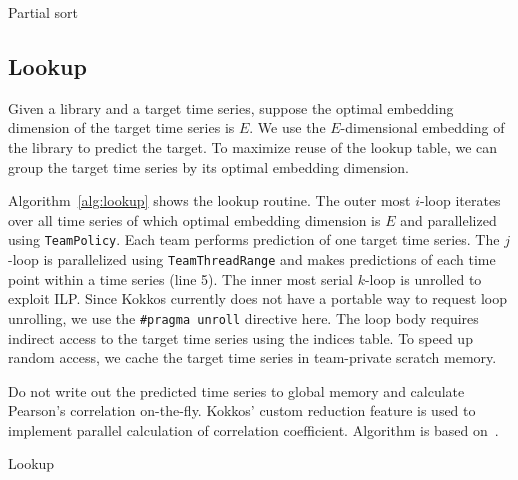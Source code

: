 \documentclass[conference]{IEEEtran}
\begin{document}
\begin{algorithm}
    \SetAlgoLined
    \DontPrintSemicolon
    \caption{Partial sort}%
    \label{alg:sort}
\end{algorithm}

\subsection{Lookup}

Given a library and a target time series, suppose the optimal embedding
dimension of the target time series is $E$. We use the $E$-dimensional embedding
of the library to predict the target. To maximize reuse of the lookup table, we
can group the target time series by its optimal embedding dimension.

Algorithm~\ref{alg:lookup} shows the lookup routine. The outer most $i$-loop
iterates over all time series of which optimal embedding dimension is $E$ and
parallelized using \texttt{TeamPolicy}. Each team performs prediction of one
target time series. The $j$-loop is parallelized using \texttt{TeamThreadRange}
and makes predictions of each time point within a time series (line 5). The
inner most serial $k$-loop is unrolled to exploit ILP\@. Since Kokkos currently
does not have a portable way to request loop unrolling, we use the
\texttt{\#pragma unroll} directive here. The loop body requires indirect access
to the target time series using the indices table. To speed up random access, we
cache the target time series in team-private scratch memory.

Do not write out the predicted time series to global memory and calculate
Pearson’s correlation on-the-fly. Kokkos’ custom reduction feature is used to
implement parallel calculation of correlation coefficient. Algorithm is
based on~\cite{Schubert2018}.

\begin{algorithm}
    \SetAlgoLined
    \DontPrintSemicolon
     
    \caption{Lookup}%
    \label{alg:lookup}
\end{algorithm}
\end{document}
